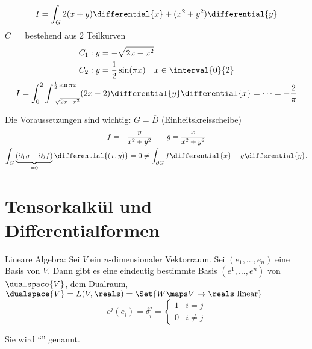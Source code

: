 \begin{beispiel}
\begin{equation*}
    I=\int_G 2(x+y)\differential{x}+(x^2+y^2)\differential{y}
\end{equation*}
\( C= \) bestehend aus 2 Teilkurven
\begin{gather*}
    \begin{aligned}[t]
        C_1:y&=-\sqrt{2x-x^2}\\
        C_2:y&=\frac{1}{2} \sin(\pi x)\quad x\in \interval{0}{2}            
    \end{aligned}\\
    I=\int_{0}^{2}\int_{-\sqrt{2x-x^2}}^{\frac{1}{2}\sin\pi x}(2x-2)\differential{y}\differential{x}=\dotsb =-\frac{2}{\pi} 
\end{gather*}
\begin{achtung*}
    Die Voraussetzungen sind wichtig:
    \( G=\overline{D} \) (Einheitskreisscheibe)
    \begin{gather*}
        f=-\frac{y}{x^2+y^2} \qquad g=\frac{x}{x^2+y^2} \\
        \int_G\underbrace{(\partial_1g-\partial_2f)}_{=0}\differential{(x,y)}=0 \neq \int_{\partial G}f\differential{x}+g\differential{y}.
    \end{gather*}
\end{achtung*}
\end{beispiel}

\section{Tensorkalkül und Differentialformen}
Lineare Algebra: Sei \( V \) ein \( n \)-dimensionaler Vektorraum.
Sei \( (e_1,\ldots ,e_n) \) eine Basis von \( V \). 
Dann gibt es eine eindeutig bestimmte Basis \( (e^1,\ldots ,e^n) \) von \( \dualspace{V} \), dem Dualraum, \( \dualspace{V}=L(V,\reals)=\Set{W\maps V\to\reals \text{ linear} } \)
\sd 
\begin{equation*}
e^j(e_i)=\delta_i^j=\begin{cases}
    1 & i=j\\
    0 & i\neq j
\end{cases}
\end{equation*}

Sie wird \enquote{} genannt.

